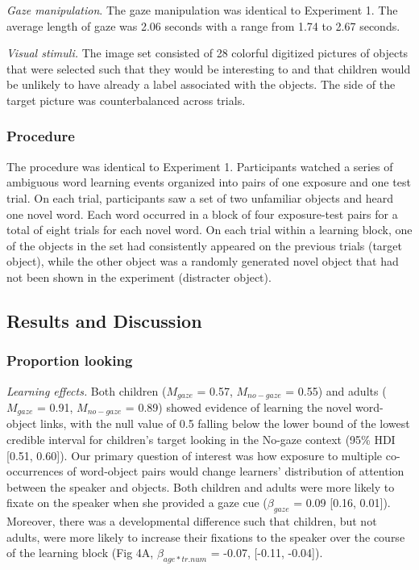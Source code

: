 \documentclass[10pt, letterpaper]{article}
\begin{document}
\emph{Gaze manipulation}. The gaze manipulation was identical to
Experiment 1. The average length of gaze was 2.06 seconds with a range
from 1.74 to 2.67 seconds.

\emph{Visual stimuli.} The image set consisted of 28 colorful digitized
pictures of objects that were selected such that they would be
interesting to and that children would be unlikely to have already a
label associated with the objects. The side of the target picture was
counterbalanced across trials.

\hypertarget{procedure-1}{%
\subsubsection{Procedure}\label{procedure-1}}

The procedure was identical to Experiment 1. Participants watched a
series of ambiguous word learning events organized into pairs of one
exposure and one test trial. On each trial, participants saw a set of
two unfamiliar objects and heard one novel word. Each word occurred in a
block of four exposure-test pairs for a total of eight trials for each
novel word. On each trial within a learning block, one of the objects in
the set had consistently appeared on the previous trials (target
object), while the other object was a randomly generated novel object
that had not been shown in the experiment (distracter object).

\hypertarget{results-and-discussion-1}{%
\subsection{Results and Discussion}\label{results-and-discussion-1}}

\hypertarget{proportion-looking}{%
\subsubsection{Proportion looking}\label{proportion-looking}}

\emph{Learning effects.} Both children (\(M_{gaze}\) = 0.57,
\(M_{no-gaze}\) = 0.55) and adults (\(M_{gaze}\) = 0.91, \(M_{no-gaze}\)
= 0.89) showed evidence of learning the novel word-object links, with
the null value of 0.5 falling below the lower bound of the lowest
credible interval for children's target looking in the No-gaze context
(95\% HDI {[}0.51, 0.60{]}). Our primary question of interest was how
exposure to multiple co-occurrences of word-object pairs would change
learners' distribution of attention between the speaker and objects.
Both children and adults were more likely to fixate on the speaker when
she provided a gaze cue (\(\beta_{gaze}\) = 0.09 {[}0.16, 0.01{]}).
Moreover, there was a developmental difference such that children, but
not adults, were more likely to increase their fixations to the speaker
over the course of the learning block (Fig 4A, \(\beta_{age*tr.num}\) =
-0.07, {[}-0.11, -0.04{]}).
\end{document}
